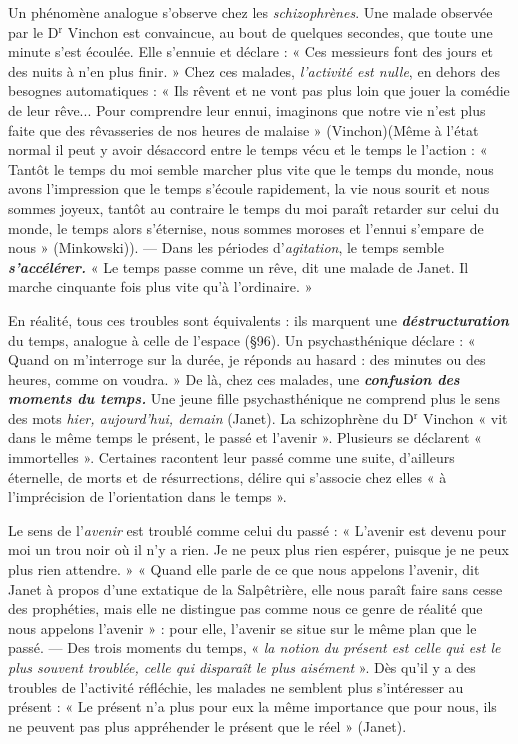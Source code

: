 Un phénomène analogue s’observe chez les {\it schizophrènes}. Une
malade observée par le D$^\text{r}$ Vinchon est convaincue, au bout de
quelques secondes, que toute une minute s’est écoulée. Elle s'ennuie
et déclare : « Ces messieurs font des jours et des nuits à n’en plus
finir. » Chez ces malades, {\it l’activité est nulle}, en dehors des besognes
automatiques : « Ils rêvent et ne vont pas plus loin que jouer la comédie
de leur rêve... Pour comprendre leur ennui, imaginons que notre
vie n’est plus faite que des rêvasseries de nos heures de malaise »
(Vinchon)({\scriptsize Même à l’état normal il peut y avoir désaccord
entre le temps vécu et le temps le l'action : « Tantôt le temps du moi
semble marcher plus vite que le temps du monde, nous avons l'impression
que le temps s'écoule rapidement, la vie nous sourit et nous sommes joyeux,
tantôt au contraire le temps du moi paraît retarder sur celui du monde, le
temps alors s'éternise, nous sommes moroses et l'ennui s'empare de nous »
(Minkowski)}). — Dans les périodes d’{\it agitation}, le temps semble
\textbf{\textit {s’accélérer.}}
« Le temps passe comme un rêve, dit une malade de Janet. Il
marche cinquante fois plus vite qu’à l’ordinaire. »

En réalité, tous ces troubles sont équivalents : ils marquent une
\textbf{\textit {déstructuration}} du temps, analogue à celle de l’espace (\S 96).
Un psychasthénique déclare : « Quand on m'interroge sur la durée, je
réponds au hasard : des minutes ou des heures, comme on voudra. »
De là, chez ces malades, une \textbf{\textit {confusion
des moments du temps.}} Une
jeune fille psychasthénique ne comprend plus le sens des mots {\it hier,
aujourd’hui, demain} (Janet). La schizophrène du D$^\text{r}$ Vinchon « vit
dans le même temps le présent, le passé et l'avenir ». Plusieurs se
déclarent « immortelles ». Certaines racontent leur passé comme une
suite, d’ailleurs éternelle, de morts et de résurrections, délire qui
s'associe chez elles « à l’imprécision de l’orientation dans le temps ».

\vspace{0.24cm}
{\footnotesize Le sens de l’{\it avenir} est troublé comme celui du passé : « L'avenir est devenu
pour moi un trou noir où il n’y a rien. Je ne peux plus rien espérer, puisque
je ne peux plus rien attendre. » « Quand elle parle de ce que nous appelons
l'avenir, dit Janet à propos d’une extatique de la Salpêtrière, elle nous
paraît faire sans cesse des prophéties, mais elle ne distingue pas comme
nous ce genre de réalité que nous appelons l’avenir » : pour elle, l’avenir se
situe sur le même plan que le passé. — Des trois moments du temps, « {\it la
notion du présent est celle qui est le plus souvent troublée, celle qui disparaît
le plus aisément} ». Dès qu’il y a des troubles de l’activité réfléchie, les malades
ne semblent plus s'intéresser au présent : « Le présent n’a plus pour eux la
même importance que pour nous, ils ne peuvent pas plus appréhender le
présent que le réel » (Janet).}
\vspace{0.31cm}

